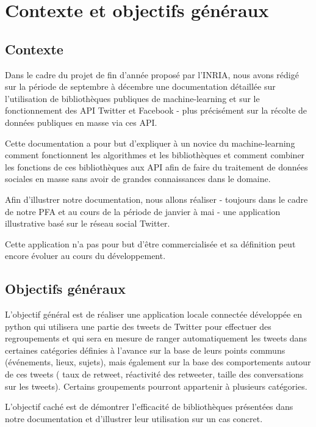 \documentclass{article}
\begin{document}
\newpage

\section{Contexte et objectifs généraux}

\subsection{Contexte}

Dans le cadre du projet de fin d’année proposé par l’INRIA, nous avons rédigé sur la période de septembre à décembre une documentation détaillée sur l’utilisation de bibliothèques publiques de machine-learning et sur le fonctionnement des API Twitter et Facebook - plus précisément sur la récolte de données publiques en masse via ces API.

Cette documentation a pour but d’expliquer à un novice du machine-learning comment fonctionnent les algorithmes et les bibliothèques  et comment combiner les fonctions de ces bibliothèques aux API afin de faire du traitement de données sociales en masse sans avoir de grandes connaissances dans le domaine.

Afin d’illustrer notre documentation, nous allons réaliser - toujours dans le cadre de notre PFA et au cours  de la période  de  janvier à mai - une application illustrative basé sur le réseau social Twitter.

Cette application n’a pas pour but d’être commercialisée et sa définition peut encore évoluer au cours du développement.

\subsection{Objectifs généraux}

L’objectif général est de réaliser une application locale connectée développée en python qui utilisera une partie des tweets de Twitter  pour effectuer des regroupements et qui sera en mesure de ranger automatiquement les tweets dans certaines catégories définies à l’avance sur la base de leurs points communs (événements, lieux, sujets), mais également sur la base des comportements autour de ces tweets ( taux de retweet, réactivité des retweeter, taille des conversations sur les tweets). Certains groupements  pourront appartenir à plusieurs catégories.

L’objectif caché est de démontrer l’efficacité de bibliothèques présentées dans notre documentation et d’illustrer leur utilisation sur un cas concret.
\end{document}
